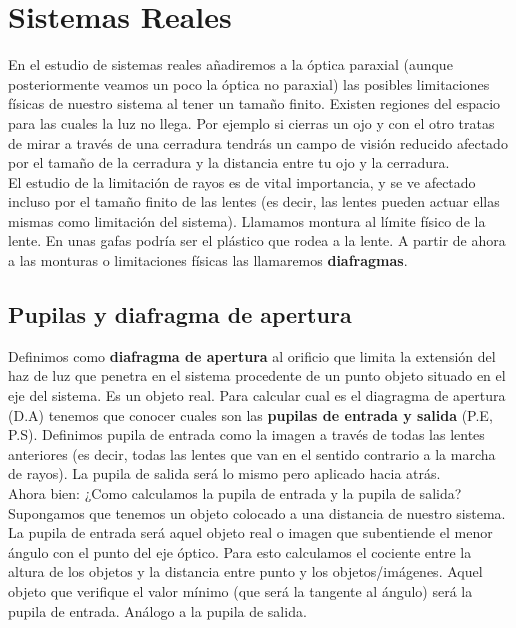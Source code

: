 \documentclass[12pt,a4paper]{article}
\numberwithin{equation}{section}
\numberwithin{figure}{section}
\begin{document}
\newpage

\section{Sistemas Reales}

En el estudio de sistemas reales añadiremos a la óptica paraxial (aunque posteriormente veamos un poco la óptica no paraxial) las posibles limitaciones físicas de nuestro sistema al tener un tamaño finito. Existen regiones del espacio para las cuales la luz no llega. Por ejemplo si cierras un ojo y con el otro tratas de mirar a través de una cerradura tendrás un campo de visión reducido afectado por el tamaño de la cerradura y la distancia entre tu ojo y la cerradura. \\

El estudio de la limitación de rayos es de vital importancia, y se ve afectado incluso por el tamaño finito de las lentes (es decir, las lentes pueden actuar ellas mismas como limitación del sistema). Llamamos montura al límite físico de la lente. En unas gafas podría ser el plástico que rodea a la lente. A partir de ahora a las monturas o limitaciones físicas las llamaremos \textbf{diafragmas}. \\

\subsection{Pupilas y diafragma de apertura}

Definimos como \textbf{diafragma de apertura} al orificio que limita la extensión del haz de luz que penetra en el sistema procedente de un punto objeto situado en el eje del sistema. Es un objeto real. Para calcular cual es el diagragma de apertura (D.A) tenemos que conocer cuales son las \textbf{pupilas de entrada y salida} (P.E, P.S). Definimos pupila de entrada como la imagen a través de todas las lentes anteriores (es decir, todas las lentes que van en el sentido contrario a la marcha de rayos). La pupila de salida será lo mismo pero aplicado hacia atrás. \\

Ahora bien: ¿Como calculamos la pupila de entrada y la pupila de salida? Supongamos que tenemos un objeto colocado a una distancia de nuestro sistema. La pupila de entrada será aquel objeto real o imagen que subentiende el menor ángulo con el punto del eje óptico. Para esto calculamos el cociente entre la altura de los objetos y la distancia entre punto y los objetos/imágenes. Aquel objeto que verifique el valor mínimo (que será la tangente al ángulo) será la pupila de entrada. Análogo a la pupila de salida. \\
\end{document}

